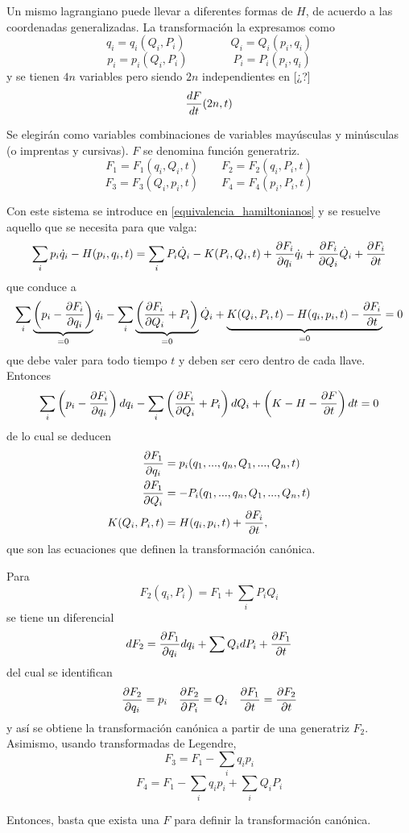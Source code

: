 \documentclass[10pt,oneside]{CBFT_book}
\begin{document}
Un mismo lagrangiano puede llevar a diferentes formas de $H$, de acuerdo a las coordenadas generalizadas.
La transformación la expresamos como
\[
	q_i = q_i(Q_i,P_i) \qquad \qquad Q_i = Q_i(p_i,q_i)
\]
\[
	p_i = p_i(Q_i,P_i) \qquad \qquad P_i = P_i(p_i,q_i)
\]
y se tienen $4n$ variables pero siendo $2n$ independientes en [¿?]
\[
	\frac{d^{\hspace{-0.05em}} {F}}{d {t}^{\hspace{-0.05em}}}(2n,t)
\]

Se elegirán como variables combinaciones de variables mayúsculas y minúsculas (o imprentas y cursivas). $F$ se denomina función 
generatriz.
\[
	F_1 = F_1(q_i,Q_i,t) \qquad F_2 = F_2(q_i,P_i,t)
\]
\[
	F_3 = F_3(Q_i,p_i,t) \qquad F_4 = F_4(p_i,P_i,t)
\]

Con este sistema se introduce en \eqref{equivalencia_hamiltonianos} y se resuelve aquello que se necesita para que valga:
\begin{multline*}
	\sum_i p_i \dot{q}_i - H(p_i,q_i,t) = \sum_i P_i\dot{Q}_i - K(P_i,Q_i,t) + \frac{\partial^{\hspace{-0.05em}} {F_i}}{\partial {q_i}^{\hspace{-0.05em}}} \dot{q}_i + 
\frac{\partial^{\hspace{-0.05em}} {F_i}}{\partial {Q_i}^{\hspace{-0.05em}}} \dot{Q}_i + \frac{\partial^{\hspace{-0.05em}} {F_i}}{\partial {t}^{\hspace{-0.05em}}} 
\end{multline*}
que conduce a 
\[
	\sum_i \underbrace{\left( p_i - \frac{\partial^{\hspace{-0.05em}} {F_i}}{\partial {q_i}^{\hspace{-0.05em}}} \right)}_{=0} \dot{q}_i  - 
	\sum_i \underbrace{\left( \frac{\partial^{\hspace{-0.05em}} {F_i}}{\partial {Q_i}^{\hspace{-0.05em}}} + P_i \right)}_{=0} \dot{Q}_i + 
	\underbrace{K( Q_i, P_i, t ) - H( q_i, p_i, t ) - \frac{\partial^{\hspace{-0.05em}} {F_i}}{\partial {t}^{\hspace{-0.05em}}}}_{=0}  = 0
\]
que debe valer para todo tiempo $t$ y deben ser cero dentro de cada llave.
Entonces
\[
	\sum_i \left( p_i - \frac{\partial^{\hspace{-0.05em}} {F_i}}{\partial {q_i}^{\hspace{-0.05em}}} \right) dq_i  - \sum_i \left( \frac{\partial^{\hspace{-0.05em}} {F_i}}{\partial {Q_i}^{\hspace{-0.05em}}} + P_i \right) dQ_i + \left( K - H - 
	\frac{\partial^{\hspace{-0.05em}} {F}}{\partial {t}^{\hspace{-0.05em}}} \right) dt = 0
\]
de lo cual se deducen
\begin{align*}
	\frac{\partial^{\hspace{-0.05em}} {F_1}}{\partial {q_i}^{\hspace{-0.05em}}} & = p_i(q_1,...,q_n,Q_1,...,Q_n,t) \\
	\frac{\partial^{\hspace{-0.05em}} {F_1}}{\partial {Q_i}^{\hspace{-0.05em}}} & = -P_i(q_1,...,q_n,Q_1,...,Q_n,t) \\
	K( Q_i, P_i, t ) & = H( q_i, p_i, t ) + \frac{\partial^{\hspace{-0.05em}} {F_i}}{\partial {t}^{\hspace{-0.05em}}},
\end{align*}
que son las ecuaciones que definen la transformación canónica.

Para 
\[
	F_2(q_i,P_i) = F_1 + \sum_i P_i Q_i
\]
se tiene un diferencial
\[
	dF_2 = \frac{\partial^{\hspace{-0.05em}} {F_1}}{\partial {q_i}^{\hspace{-0.05em}}} dq_i + \sum Q_i dP_i + \frac{\partial^{\hspace{-0.05em}} {F_1}}{\partial {t}^{\hspace{-0.05em}}}
\]
del cual se identifican
\[
	\frac{\partial^{\hspace{-0.05em}} {F_2}}{\partial {q_i}^{\hspace{-0.05em}}} = p_i \quad \frac{\partial^{\hspace{-0.05em}} {F_2}}{\partial {P_i}^{\hspace{-0.05em}}} = Q_i \quad  \frac{\partial^{\hspace{-0.05em}} {F_1}}{\partial {t}^{\hspace{-0.05em}}} = \frac{\partial^{\hspace{-0.05em}} {F_2}}{\partial {t}^{\hspace{-0.05em}}}
\]
y así se obtiene la transformación canónica a partir de una generatriz $F_2$.
Asimismo, usando transformadas de Legendre,
\[
	F_3 = F_1 - \sum_i q_i p_i
\]
\[
	F_4 = F_1 - \sum_i q_i p_i + \sum_i Q_i P_i
\]

Entonces, basta que exista una $F$ para definir la transformación canónica.
\end{document}
